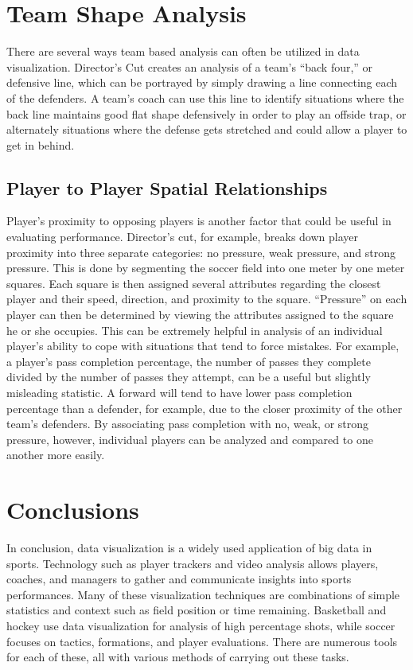 \documentclass[sigconf]{acmart}
\begin{document}
\section{Team Shape Analysis}

There are several ways team based analysis can often be utilized in data visualization. Director’s Cut creates an analysis of a team’s “back four,” or defensive line, which can be portrayed by simply drawing a line connecting each of the defenders. A team’s coach can use this line to identify situations where the back line maintains good flat shape defensively in order to play an offside trap, or alternately situations where the defense gets stretched and could allow a player to get in behind.

\subsection{Player to Player Spatial Relationships}

Player’s proximity to opposing players is another factor that could be useful in evaluating performance. Director’s cut, for example, breaks down player proximity into three separate categories: no pressure, weak pressure, and strong pressure. This is done by segmenting the soccer field into one meter by one meter squares. Each square is then assigned several attributes regarding the closest player and their speed, direction, and proximity to the square. “Pressure” on each player can then be determined by viewing the attributes assigned to the square he or she occupies. This can be extremely helpful in analysis of an individual player’s ability to cope with situations that tend to force mistakes. For example, a player’s pass completion percentage, the number of passes they complete divided by the number of passes they attempt, can be a useful but slightly misleading statistic. A forward will tend to have lower pass completion percentage than a defender, for example, due to the closer proximity of the other team’s defenders. By associating pass completion with no, weak, or strong pressure, however, individual players can be analyzed and compared to one another more easily.

\section{Conclusions}

In conclusion, data visualization is a widely used application of big data in sports. Technology such as player trackers and video analysis allows players, coaches, and managers to gather and communicate insights into sports performances. Many of these visualization techniques are combinations of simple statistics and context such as field position or time remaining. Basketball and hockey use data visualization for analysis of high percentage shots, while soccer focuses on tactics, formations, and player evaluations. There are numerous tools for each of these, all with various methods of carrying out these tasks.


 
\end{document}
